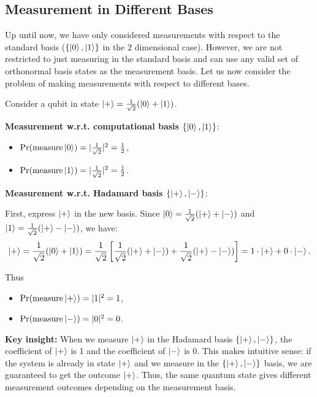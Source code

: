 \subsection{Measurement in Different Bases}
Up until now, we have only considered measurements with respect to the standard basis ($\{ \ket{0}, \ket{1} \}$ in the $2$ dimensional case). However, we are not restricted to just measuring in the standard basis and can use any valid set of orthonormal basis states as the measurement basis. Let us now consider the problem of making measurements with respect to different bases.
\begin{example}
Consider a qubit in state $\ket{+} = \frac{1}{\sqrt{2}}(\ket{0} + \ket{1})$.

\textbf{Measurement w.r.t. computational basis $\{\ket{0}, \ket{1}\}$}:
\begin{itemize}
\item $\operatorname{Pr}(\text{measure} \ket{0}) = |\frac{1}{\sqrt{2}}|^2 = \frac{1}{2}$,
\item $\operatorname{Pr}(\text{measure} \ket{1}) = |\frac{1}{\sqrt{2}}|^2 = \frac{1}{2}$.
\end{itemize}

\textbf{Measurement w.r.t. Hadamard basis $\{\ket{+}, \ket{-}\}$}:

First, express $\ket{+}$ in the new basis. Since $\ket{0} = \frac{1}{\sqrt{2}}(\ket{+} + \ket{-})$ and $\ket{1} = \frac{1}{\sqrt{2}}(\ket{+} - \ket{-})$, we have:
$$\ket{+} = \frac{1}{\sqrt{2}}(\ket{0} + \ket{1}) = \frac{1}{\sqrt{2}}\left[\frac{1}{\sqrt{2}}(\ket{+} + \ket{-}) + \frac{1}{\sqrt{2}}(\ket{+} - \ket{-})\right] = 1 \cdot \ket{+} + 0 \cdot \ket{-}.$$

Thus
\begin{itemize}
\item $\operatorname{Pr}(\text{measure} \ket{+}) = |1|^2 = 1$,
\item $\operatorname{Pr}(\text{measure} \ket{-}) = |0|^2 = 0$.
\end{itemize}

\textbf{Key insight:} When we measure $\ket{+}$ in the Hadamard basis $\{\ket{+}, \ket{-}\}$, the coefficient of $\ket{+}$ is 1 and the coefficient of $\ket{-}$ is 0. This makes intuitive sense: if the system is already in state $\ket{+}$ and we measure in the $\{\ket{+}, \ket{-}\}$ basis, we are guaranteed to get the outcome $\ket{+}$. Thus, the same quantum state gives different measurement outcomes depending on the measurement basis.
\end{example}

